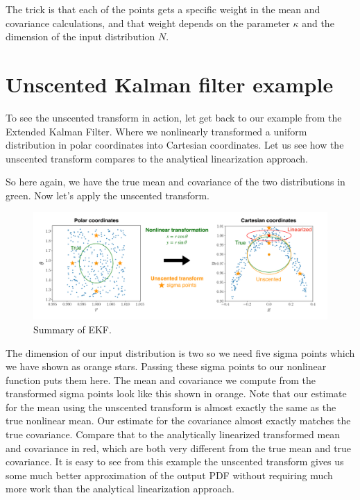 The trick is that each of the points gets a specific weight in the mean and covariance calculations, and that weight
depends on the parameter $\kappa$ and the dimension of the input distribution $N$. 

\section{Unscented Kalman filter example}

To see the unscented transform in action, let get back to our example
from the Extended Kalman Filter. Where we nonlinearly transformed a uniform
distribution in polar coordinates into Cartesian coordinates. Let us see how the unscented
transform compares to the analytical linearization approach. 

So here again, we have the true mean and covariance of the two
distributions in green. Now let's apply the unscented transform. 


\begin{figure}[!htb]
\begin{center}
\includegraphics[scale=0.280]{img/kalman_filter/unscented_kalman_filter_3.jpeg}
\end{center}
\caption{Summary of EKF.}
\label{unscented_kalman_filter_3}
\end{figure}

The dimension of our input distribution is two so we need five sigma points which
we have shown as orange stars. Passing these sigma points to our
nonlinear function puts them here. The mean and covariance we compute
from the transformed sigma points look like this shown in orange. Note that our estimate for
the mean using the unscented transform is almost exactly the same as
the true nonlinear mean. Our estimate for the covariance almost
exactly matches the true covariance. Compare that to the analytically
linearized transformed mean and covariance in red, which are both very different
from the true mean and true covariance. It is easy to see from this example
the unscented transform gives us some much better approximation of the output
PDF without requiring much more work than the analytical
linearization approach. 

